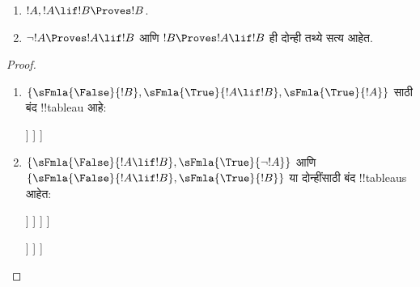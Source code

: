 \documentclass[../../../include/open-logic-section]{subfiles}
\begin{document}
\begin{prop}
  \begin{enumerate}
  \item {}  $!A, !A \lif !B \Proves !B$.
  \item {}
    $\lnot !A \Proves !A \lif !B$ आणि $!B \Proves !A \lif !B$ ही दोन्ही
    तथ्ये सत्य आहेत.
  \end{enumerate}
\end{prop}

\begin{proof}
  \begin{enumerate}
    \item $\{\sFmla{\False}{!B}, \sFmla{\True}{!A \lif !B},
      \sFmla{\True}{!A}\}$ साठी बंद !!{tableau} आहे:
      \begin{oltableau}
        [\sFmla{\False}{\formula{B}}, just=\TAss
          [\sFmla{\True}{\formula{A} \lif \formula{B}}, just=\TAss
            [\sFmla{\True}{\formula{A}}, just=\TAss
              [\sFmla{\False}{\formula{A}}, just = {\TRule{\True}{\lif}[2]}, close]
              [\sFmla{\True}{\formula{B}}, just = {\TRule{\True}{\lif}[2]}, close]
            ]
          ]
        ]
      \end{oltableau}
    \item $\{\sFmla{\False}{!A \lif !B}, \sFmla{\True}{\lnot !A}\}$ आणि
      $\{\sFmla{\False}{!A \lif !B}, \sFmla{\True}{!B}\}$ या दोन्हींसाठी
      बंद !!{tableau}s आहेत:
      \begin{oltableau}
        [\sFmla{\False}{\formula{A} \lif \formula{B}}, just = \TAss
          [\sFmla{\True}{\lnot \formula{A}}, just = \TAss
            [\sFmla{\True}{\formula{A}}, just = {\TRule{\False}{\lif}[1]}
              [\sFmla{\False}{\formula{B}}, just = {\TRule{\False}{\lif}[1]}
                [\sFmla{\False}{\formula{A}}, just = {\TRule{\True}{\lnot}[2]}, close]
              ]
            ]
          ]
        ]
      \end{oltableau}
      \begin{oltableau}
        [\sFmla{\False}{\formula{A} \lif \formula{B}}, just = \TAss
          [\sFmla{\True}{\formula{B}}, just = \TAss
            [\sFmla{\True}{\formula{A}}, just = {\TRule{\False}{\lif}[1]}
              [\sFmla{\False}{\formula{B}}, just = {\TRule{\False}{\lif}[1]},close
              ]
            ]
          ]
        ]
      \end{oltableau}
  \end{enumerate}
\end{proof}
\end{document}
